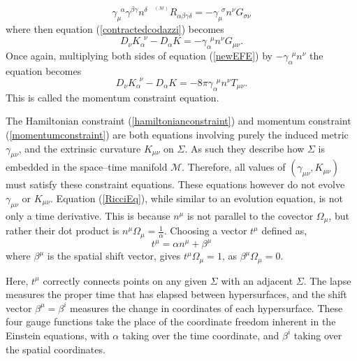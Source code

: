 \documentclass[11pt]{article}
\newcommand{\blank}{\enspace}
\newcommand{\sttensor}{\text{ }{\scriptscriptstyle ^{^{(\mathcal{M})}}}}
\numberwithin{equation}{section}
\begin{document}
\begin{equation}
\gamma_{\mu}^{\blank\alpha} \gamma^{\beta\gamma} n^{\delta} \sttensor R_{\alpha\beta\gamma\delta} = -\gamma_{\mu}^{\blank\sigma}n^{\nu} G_{\sigma\nu}
\end{equation}
where then equation (\ref{contractedcodazzi}) becomes
\begin{equation}
    D_{\nu}K_{\alpha}^{\blank\nu} - D_{\alpha}K = -\gamma_{\alpha}^{\blank\mu}n^{\nu} G_{\mu\nu}.
\end{equation}
Once again, multiplying both sides of equation (\ref{newEFE}) by $-\gamma_{\alpha}^{\blank\mu}n^{\nu}$ the equation becomes
\begin{equation}\label{momentumconstraint}
    D_{\nu}K_{\alpha}^{\blank\nu} - D_{\alpha}K = -8\pi\gamma_{\alpha}^{\blank\mu}n^{\nu}T_{\mu\nu}.
\end{equation}
This is called the momentum constraint equation. 

The Hamiltonian constraint (\ref{hamiltonianconstraint}) and momentum constraint (\ref{momentumconstraint}) are both equations involving purely the induced metric $\gamma_{\mu\nu}$, and the extrinsic curvature $K_{\mu\nu}$ on $\Sigma$. As such they describe how $\Sigma$ is embedded in the space--time manifold $\mathcal{M}$. Therefore, all values of $(\gamma_{\mu\nu}, K_{\mu\nu})$ must satisfy these constraint equations. These equations however do not evolve $\gamma_{\mu\nu}$ or $K_{\mu\nu}$. Equation (\ref{RicciEq}), while similar to an evolution equation, is not only a time derivative. This is because $n^{\mu}$ is not parallel to the covector $\Omega_{\mu}$, but rather their dot product is $n^{\mu}\Omega_{\mu} = \frac{1}{\alpha}$. Choosing a vector $t^{\mu}$ defined as,
\begin{equation}
    t^{\mu} = \alpha n^{\mu} + \beta^{\mu}
\end{equation}
where $\beta^{\mu}$ is the spatial shift vector, gives $t^{\mu}\Omega_{\mu} = 1$, as $\beta^{\mu}\Omega_{\mu} = 0$. 

Here, $t^{\mu}$ correctly connects points on any given $\Sigma$ with an adjacent $\Sigma$. The lapse measures the proper time that has elapsed between hypersurfaces, and the shift vector $\beta^{\mu} = \beta^{i}$ measures the change in coordinates of each hypersurface. These four gauge functions take the place of the coordinate freedom inherent in the Einstein equations, with $\alpha$ taking over the time coordinate, and $\beta^i$ taking over the spatial coordinates. 
\end{document}
